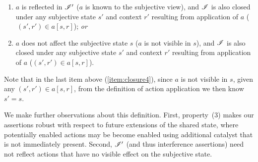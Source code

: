 	\begin{enumerate}\renewcommand{\theenumi}{\alph{enumi}}
		\item $a$ is reflected in $\mathscr{I}'$ ($a$ is known to the subjective view), and $\mathscr{I}$ is also closed under any subjective state $s'$ and context $r'$ resulting from application of $a$ ($\,(s', r') \in a[s, r]$); \textit{or} 
		\item  \label{item:closure4}
		$a$ does not affect the subjective state $s$ ($a$ is not visible in $s$), and $\mathscr{I}$ is also closed under any subjective state $s'$ and context $r'$ resulting from application of $a$ ($(s', r') \in a[s, r]$). 
	\end{enumerate}
%
%
Note that in the last item above (\ref{item:closure4}), since $a$ is not visible in $s$, given any $(s', r') \in a[s, r]$, from the definition of action application we then know $s' = s$. 





We make further observations about this definition. First, property~(3) makes our assertions robust with respect to future extensions of the shared state, where potentially enabled actions may be become enabled using additional catalyst that is not immediately present. Second, $\mathscr{I}'$ (and thus interference assertions) need not reflect actions that have no visible effect on the subjective state.\\

